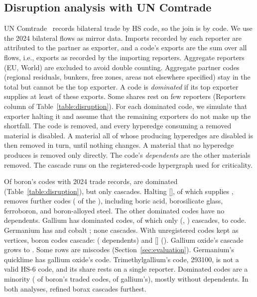 \subsection{Disruption analysis with UN Comtrade}
UN Comtrade~\cite{UNComtrade2024} records bilateral trade by HS code, so the join is by code. We use the 2024 bilateral flows as mirror data. Imports recorded by each reporter are attributed to the partner as exporter, and a code's exports are the sum over all flows, i.e., exports as recorded by the \DisruptReporters{} importing reporters. Aggregate reporters (EU, World) are excluded to avoid double counting. Aggregate partner codes (regional residuals, bunkers, free zones, areas not elsewhere specified) stay in the total but cannot be the top exporter. A code is \emph{dominated} if its top exporter supplies at least \DisruptThreshold{} of these exports. Some shares rest on few reporters (Reporters column of Table~\ref{table:disruption}). For each dominated code, we simulate that exporter halting it and assume that the remaining exporters do not make up the shortfall. The code is removed, and every hyperedge consuming a removed material is disabled. A material all of whose producing hyperedges are disabled is then removed in turn, until nothing changes. A material that no hyperedge produces is removed only directly. The code's \emph{dependents} are the other materials removed. The cascade runs on the registered-code hypergraph used for criticality.

{\setlength{\tabcolsep}{2.5pt}\DisruptionTable}

Of boron's \DisruptInComtradeBoron{} codes with 2024 trade records, \DisruptDominatedBoron{} are dominated (Table~\ref{table:disruption}), but only \DisruptCascadingBoron{} cascades. Halting \DisruptMaxNameBoron{} [\DisruptMaxCodeBoron], of which \DisruptMaxSupplierBoron{} supplies \DisruptMaxShareBoron{}, removes \DisruptMaxDependentsBoron{} further codes (\DisruptMaxDependentsFracBoron{} of the \tool{}), including boric acid, borosilicate glass, ferroboron, and boron-alloyed steel. The other \DisruptLocalBoron{} dominated codes have no dependents. Gallium has \DisruptDominatedGallium{} dominated codes, of which only \DisruptMaxNameGallium{} (\DisruptMaxSupplierGallium{}, \DisruptMaxShareGallium{}) cascades, to \DisruptMaxDependentsGallium{} code. Germanium has \DisruptDominatedGermanium{} and cobalt \DisruptDominatedCobalt{}; none cascades. With unregistered codes kept as vertices, \DisruptCascadingInclUnregBoron{} boron codes cascade: \DisruptCascadeFirstNameInclUnregBoron{} (\DisruptCascadeFirstDependentsInclUnregBoron{} dependents) and \DisruptCascadeSecondNameInclUnregBoron{} [\DisruptCascadeSecondCodeInclUnregBoron] (\DisruptCascadeSecondDependentsInclUnregBoron{}). Gallium oxide's cascade grows to \DisruptCascadeFirstDependentsInclUnregGallium{}. Some rows are miscodes (Section~\ref{sec:evaluation}). Germanium's quicklime has gallium oxide's code. Trimethylgallium's code, 293100, is not a valid HS-6 code, and its share rests on a single reporter. Dominated codes are a minority (\DisruptDominatedFracBoron{} of boron's traded codes, \DisruptDominatedFracGallium{} of gallium's), mostly without dependents. In both analyses, refined borax cascades furthest.

